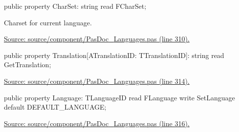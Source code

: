 \documentclass{report}
\newif\ifpdf
\begin{document}
\begin{list}{}{
\setlength{\itemindent}{0cm}
\setlength{\listparindent}{0cm}
\setlength{\leftmargin}{\evensidemargin}
\addtolength{\leftmargin}{\tmplength}
\settowidth{\labelsep}{X}
\addtolength{\leftmargin}{\labelsep}
\setlength{\labelwidth}{\tmplength}
}
\label{PasDoc_Languages.TPasDocLanguages-CharSet}
\item[\textbf{CharSet}\hfill]
\ifpdf
\begin{flushleft}
\fi
\begin{ttfamily}
public property CharSet: string read FCharSet;\end{ttfamily}

\ifpdf
\end{flushleft}
\fi


\par Charset for current language.\par
\href{https://github.com/pasdoc/pasdoc/blob/master/source/component/PasDoc_Languages.pas#L310}{Source: source/component/PasDoc{\_}Languages.pas (line 310).}\label{PasDoc_Languages.TPasDocLanguages-Translation}
\item[\textbf{Translation}\hfill]
\ifpdf
\begin{flushleft}
\fi
\begin{ttfamily}
public property Translation[ATranslationID: TTranslationID]: string read GetTranslation;\end{ttfamily}

\ifpdf
\end{flushleft}
\fi


\par  \par
\href{https://github.com/pasdoc/pasdoc/blob/master/source/component/PasDoc_Languages.pas#L314}{Source: source/component/PasDoc{\_}Languages.pas (line 314).}\label{PasDoc_Languages.TPasDocLanguages-Language}
\item[\textbf{Language}\hfill]
\ifpdf
\begin{flushleft}
\fi
\begin{ttfamily}
public property Language: TLanguageID read FLanguage write SetLanguage
      default DEFAULT{\_}LANGUAGE;\end{ttfamily}

\ifpdf
\end{flushleft}
\fi


\par  \par
\href{https://github.com/pasdoc/pasdoc/blob/master/source/component/PasDoc_Languages.pas#L316}{Source: source/component/PasDoc{\_}Languages.pas (line 316).}\end{list}
\end{document}
